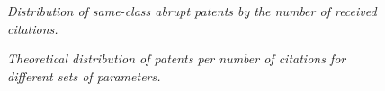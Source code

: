 \documentclass[letterpaper,12pt]{article}
\theoremstyle{definition}
\begin{document}
\begin{figure}[htb]\centering \captionsetup{width=5.8in}
    \caption{\label{fig:SameClassDistr}\textit{Distribution of same-class abrupt patents by the number of received citations.}}
\end{figure}

\begin{figure}[htb]\centering \captionsetup{width=5.8in}
    \caption{\label{fig:ImpactPar}\textit{Theoretical distribution of patents per number of citations for different sets of parameters.}}
\end{figure}
\end{document}
